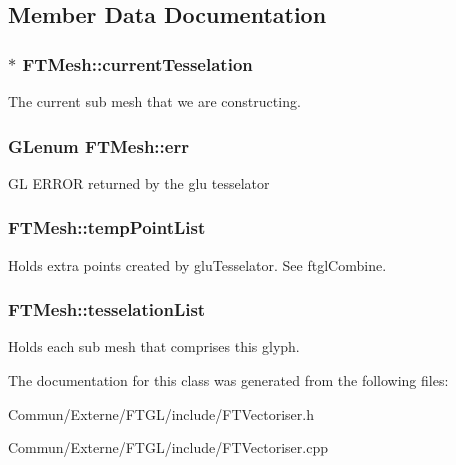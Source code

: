 \subsection{Member Data Documentation}
\subsubsection[{\texorpdfstring{current\+Tesselation}{currentTesselation}}]{$\ast$ F\+T\+Mesh\+::current\+Tesselation\hspace{0.3cm}{\ttfamily [private]}}\hypertarget{class_f_t_mesh_a1352fa66154a24590b6ed4f27c65f1ec}{}\label{class_f_t_mesh_a1352fa66154a24590b6ed4f27c65f1ec}
The current sub mesh that we are constructing. 
\subsubsection[{\texorpdfstring{err}{err}}]{\setlength{\rightskip}{0pt plus 5cm}G\+Lenum F\+T\+Mesh\+::err\hspace{0.3cm}{\ttfamily [private]}}\hypertarget{class_f_t_mesh_a5a25a6603f00ce812e43b0362d2882a5}{}\label{class_f_t_mesh_a5a25a6603f00ce812e43b0362d2882a5}
GL E\+R\+R\+OR returned by the glu tesselator 
\subsubsection[{\texorpdfstring{temp\+Point\+List}{tempPointList}}]{ F\+T\+Mesh\+::temp\+Point\+List\hspace{0.3cm}{\ttfamily [private]}}\hypertarget{class_f_t_mesh_a2d33ccfb8c6be7f7b1df735881322dc9}{}\label{class_f_t_mesh_a2d33ccfb8c6be7f7b1df735881322dc9}
Holds extra points created by glu\+Tesselator. See ftgl\+Combine. 
\subsubsection[{\texorpdfstring{tesselation\+List}{tesselationList}}]{ F\+T\+Mesh\+::tesselation\+List\hspace{0.3cm}{\ttfamily [private]}}\hypertarget{class_f_t_mesh_a1b32e89cf5def0c7b54e07d7034ae6ae}{}\label{class_f_t_mesh_a1b32e89cf5def0c7b54e07d7034ae6ae}
Holds each sub mesh that comprises this glyph. 

The documentation for this class was generated from the following files\+:\begin{DoxyCompactItemize}
\item 
Commun/\+Externe/\+F\+T\+G\+L/include/F\+T\+Vectoriser.\+h\item 
Commun/\+Externe/\+F\+T\+G\+L/include/F\+T\+Vectoriser.\+cpp\end{DoxyCompactItemize}
